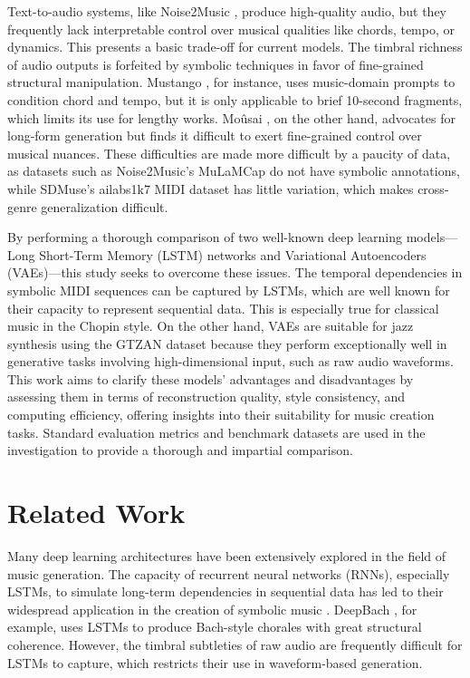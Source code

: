 \documentclass[conference]{IEEEtran}
\begin{document}
Text-to-audio systems, like Noise2Music \cite{huang2023noise2musictextconditionedmusicgeneration}, produce high-quality audio, but they frequently lack interpretable control over musical qualities like chords, tempo, or dynamics. This presents a basic trade-off for current models.  The timbral richness of audio outputs is forfeited by symbolic techniques in favor of fine-grained structural manipulation.  Mustango \cite{melechovsky2024mustangocontrollabletexttomusicgeneration}, for instance, uses music-domain prompts to condition chord and tempo, but it is only applicable to brief 10-second fragments, which limits its use for lengthy works.  Moûsai \cite{schneider2023mousaitexttomusicgenerationlongcontext}, on the other hand, advocates for long-form generation but finds it difficult to exert fine-grained control over musical nuances.  These difficulties are made more difficult by a paucity of data, as datasets such as Noise2Music's MuLaMCap do not have symbolic annotations, while SDMuse's ailabs1k7 MIDI dataset has little variation, which makes cross-genre generalization difficult.


By performing a thorough comparison of two well-known deep learning models—Long Short-Term Memory (LSTM) networks and Variational Autoencoders (VAEs)—this study seeks to overcome these issues.  The temporal dependencies in symbolic MIDI sequences can be captured by LSTMs, which are well known for their capacity to represent sequential data. This is especially true for classical music in the Chopin style.  On the other hand, VAEs are suitable for jazz synthesis using the GTZAN dataset because they perform exceptionally well in generative tasks involving high-dimensional input, such as raw audio waveforms.  This work aims to clarify these models' advantages and disadvantages by assessing them in terms of reconstruction quality, style consistency, and computing efficiency, offering insights into their suitability for music creation tasks. Standard evaluation metrics and benchmark datasets are used in the investigation to provide a thorough and impartial comparison.

\section{Related Work}
Many deep learning architectures have been extensively explored in the field of music generation.  The capacity of recurrent neural networks (RNNs), especially LSTMs, to simulate long-term dependencies in sequential data has led to their widespread application in the creation of symbolic music \cite{1030094}.  DeepBach \cite{pmlr-v70-hadjeres17a}, for example, uses LSTMs to produce Bach-style chorales with great structural coherence.  However, the timbral subtleties of raw audio are frequently difficult for LSTMs to capture, which restricts their use in waveform-based generation.
\end{document}
